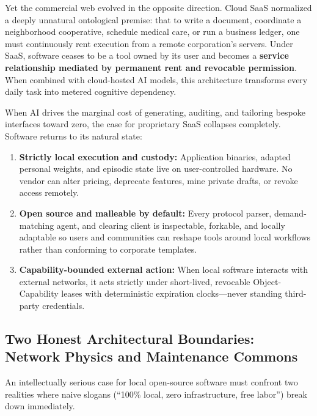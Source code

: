 \documentclass[11pt]{article}
\begin{document}
Yet the commercial web evolved in the opposite direction. Cloud SaaS normalized a deeply unnatural ontological premise: that to write a document, coordinate a neighborhood cooperative, schedule medical care, or run a business ledger, one must continuously rent execution from a remote corporation's servers. Under SaaS, software ceases to be a tool owned by its user and becomes a \textbf{service relationship mediated by permanent rent and revocable permission}. When combined with cloud-hosted AI models, this architecture transforms every daily task into metered cognitive dependency.

When AI drives the marginal cost of generating, auditing, and tailoring bespoke interfaces toward zero, the case for proprietary SaaS collapses completely. Software returns to its natural state:
\begin{enumerate}
  \item \textbf{Strictly local execution and custody:} Application binaries, adapted personal weights, and episodic state live on user-controlled hardware. No vendor can alter pricing, deprecate features, mine private drafts, or revoke access remotely.
  \item \textbf{Open source and malleable by default:} Every protocol parser, demand-matching agent, and clearing client is inspectable, forkable, and locally adaptable so users and communities can reshape tools around local workflows rather than conforming to corporate templates.
  \item \textbf{Capability-bounded external action:} When local software interacts with external networks, it acts strictly under short-lived, revocable Object-Capability leases \citep{dennis1966programming} with deterministic expiration clocks---never standing third-party credentials.
\end{enumerate}

\subsection{Two Honest Architectural Boundaries: Network Physics and Maintenance Commons}

An intellectually serious case for local open-source software must confront two realities where naive slogans (``100\% local, zero infrastructure, free labor'') break down immediately.
\end{document}

